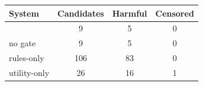 \begin{tabular}{lccc}
\toprule
System & Candidates & Harmful & Censored \\
\midrule
\evox{}              & 9   & 5  & 0 \\
\evox{} no gate      & 9   & 5  & 0 \\
\evox{} rules-only   & 106 & 83 & 0 \\
\evox{} utility-only & 26  & 16 & 1 \\
\bottomrule
\end{tabular}
